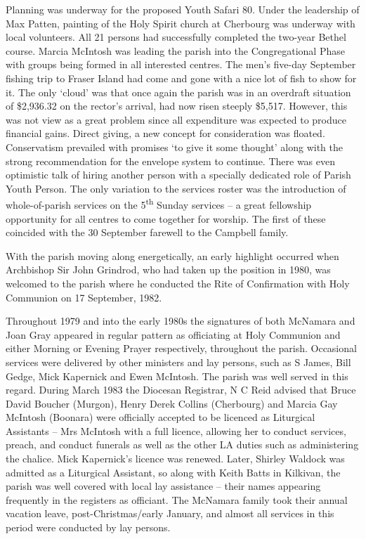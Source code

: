 Planning was underway for the proposed Youth Safari 80. Under the
leadership of Max Patten, painting of the Holy Spirit church at
Cherbourg was underway with local volunteers. All 21 persons had
successfully completed the two-year Bethel course. Marcia McIntosh was
leading the parish into the Congregational Phase with groups being
formed in all interested centres. The men's five-day September fishing
trip to Fraser Island had come and gone with a nice lot of fish to show
for it. The only `cloud' was that once again the parish was in an
overdraft situation of \$2,936.32 on the rector's arrival, had now risen
steeply \$5,517. However, this was not view as a great problem since all
expenditure was expected to produce financial gains. Direct giving, a
new concept for consideration was floated. Conservatism prevailed with
promises `to give it some thought' along with the strong recommendation
for the envelope system to continue. There was even optimistic talk of
hiring another person with a specially dedicated role of Parish Youth
Person. The only variation to the services roster was the introduction
of whole-of-parish services on the 5\textsuperscript{th} Sunday services
-- a great fellowship opportunity for all centres to come together for
worship. The first of these coincided with the 30 September farewell to
the Campbell family.

With the parish moving along energetically, an early highlight occurred
when Archbishop Sir John Grindrod, who had taken up the position in
1980, was welcomed to the parish where he conducted the Rite of
Confirmation with Holy Communion on 17 September, 1982.

Throughout 1979 and into the early 1980s the signatures of both McNamara
and Joan Gray appeared in regular pattern as officiating at Holy
Communion and either Morning or Evening Prayer respectively, throughout
the parish. Occasional services were delivered by other ministers and
lay persons, such as S James, Bill Gedge, Mick Kapernick and Ewen
McIntosh. The parish was well served in this regard. During March 1983
the Diocesan Registrar, N C Reid advised that Bruce David Boucher
(Murgon), Henry Derek Collins (Cherbourg) and Marcia Gay McIntosh
(Boonara) were officially accepted to be licenced as Liturgical
Assistants -- Mrs McIntosh with a full licence, allowing her to conduct
services, preach, and conduct funerals as well as the other LA duties
such as administering the chalice. Mick Kapernick's licence was renewed.
Later, Shirley Waldock was admitted as a Liturgical Assistant, so along
with Keith Batts in Kilkivan, the parish was well covered with local lay
assistance -- their names appearing frequently in the registers as
officiant. The McNamara family took their annual vacation leave,
post-Christmas/early January, and almost all services in this period
were conducted by lay persons.

